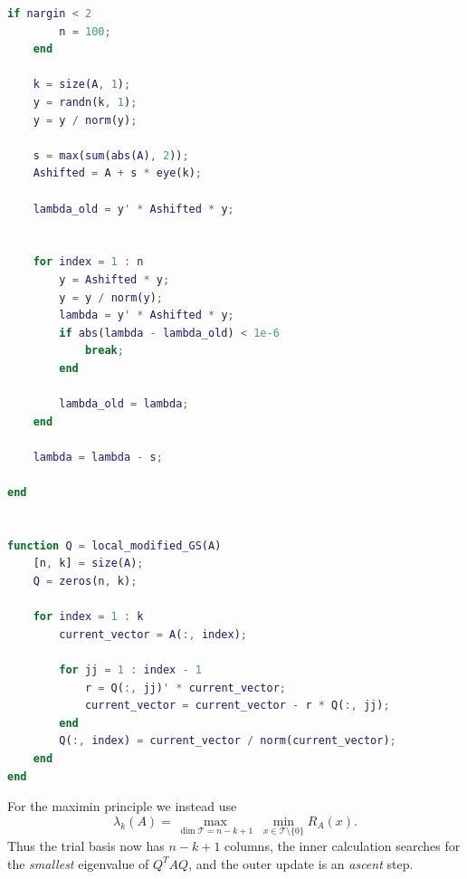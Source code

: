 \documentclass[14pt,letterpaper]{article}
\theoremstyle{plain}
\theoremstyle{definition}
\theoremstyle{remark}
\begin{document}
\begin{lstlisting}[language=Matlab,caption={Original educational Courant--Fischer minimax implementation.},label={lst:cf_minmax}]
	if nargin < 2 
		n = 100;
	end

	k = size(A, 1);
	y = randn(k, 1);
	y = y / norm(y);

	s = max(sum(abs(A), 2));
	Ashifted = A + s * eye(k);
	
	lambda_old = y' * Ashifted * y;


	for index = 1 : n
		y = Ashifted * y;
		y = y / norm(y);
		lambda = y' * Ashifted * y;
		if abs(lambda - lambda_old) < 1e-6 
			break;
		end

		lambda_old = lambda;
	end

	lambda = lambda - s;
	
end


function Q = local_modified_GS(A)
	[n, k] = size(A);
	Q = zeros(n, k);

	for index = 1 : k 
		current_vector = A(:, index);

		for jj = 1 : index - 1 
			r = Q(:, jj)' * current_vector;
			current_vector = current_vector - r * Q(:, jj);
		end
		Q(:, index) = current_vector / norm(current_vector);
	end
end
\end{lstlisting}

For the maximin principle we instead use
\[
\lambda_k(A)=
\max_{\dim\mathcal T=n-k+1}\;\min_{x\in\mathcal T\setminus\{0\}}R_A(x).
\]
Thus the trial basis now has $n-k+1$ columns, the
inner calculation searches for the \emph{smallest}
eigenvalue of $Q^TAQ$, and the outer update is an
\emph{ascent} step.
\end{document}
